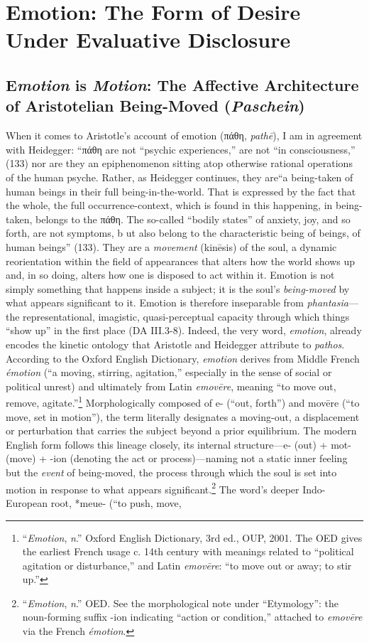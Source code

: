 \documentclass{article}
\newcommand{\gk}[1]{{\greekfont #1}}
\begin{document}
\section{Emotion: The Form of Desire Under Evaluative Disclosure}


\subsection{E\textit{motion} is \textit{Motion}: The Affective Architecture of Aristotelian Being-Moved (\textit{Paschein})}

When it comes to Aristotle’s account of emotion (\gk{πάθη}, \textit{pathē}), I am in agreement with Heidegger: ``\gk{πάθη} are not ``psychic experiences,'' are not ``in consciousness,'' (133) nor are they an epiphenomenon sitting atop otherwise rational operations of the human psyche. Rather, as Heidegger continues, they are``a being-taken of human beings in their full being-in-the-world. That is expressed by the fact that the whole, the full occurrence-context, which is found in this happening, in being-taken, belongs to the \gk{πάθη}. The so-called ``bodily states'' of anxiety, joy, and so forth, are not symptoms, b ut also belong to the characteristic being of beings, of human beings'' (133). They are a \textit{movement} (kinēsis) of the soul, a dynamic reorientation within the field of appearances that alters how the world shows up and, in so doing, alters how one is disposed to act within it. Emotion is not simply something that happens inside a subject; it is the soul’s \textit{being-moved} by what appears significant to it. Emotion is therefore inseparable from \textit{phantasia}—the representational, imagistic, quasi-perceptual capacity through which things “show up” in the first place (DA III.3-8). Indeed, the very word, \textit{emotion}, already encodes the kinetic ontology that Aristotle and Heidegger attribute to \textit{pathos}. According to the Oxford English Dictionary, \textit{emotion} derives from Middle French \textit{émotion} (“a moving, stirring, agitation,” especially in the sense of social or political unrest) and ultimately from Latin \textit{emovēre}, meaning “to move out, remove, agitate.”\footnote{“\textit{Emotion}, \textit{n}.” Oxford English Dictionary, 3rd ed., OUP, 2001. The OED gives the earliest French usage c. 14th century with meanings related to “political agitation or disturbance,” and Latin \textit{emovēre}: “to move out or away; to stir up.”} Morphologically composed of e- (“out, forth”) and movēre (“to move, set in motion”), the term  literally designates a moving-out, a displacement or perturbation that carries the subject beyond a prior equilibrium. The modern English form follows this lineage closely, its internal structure—e- (out) + mot- (move) + -ion (denoting the act or process)—naming not a static inner feeling but the \textit{event} of being-moved, the process through which the soul is set into motion in response to what appears significant.\footnote{“\textit{Emotion}, \textit{n}.” OED. See the morphological note under “Etymology”: the noun-forming suffix -ion indicating “action or condition,” attached to \textit{emovēre} via the French \textit{émotion}.} The word’s deeper Indo-European root, *meue- (“to push, move, 
\end{document}
